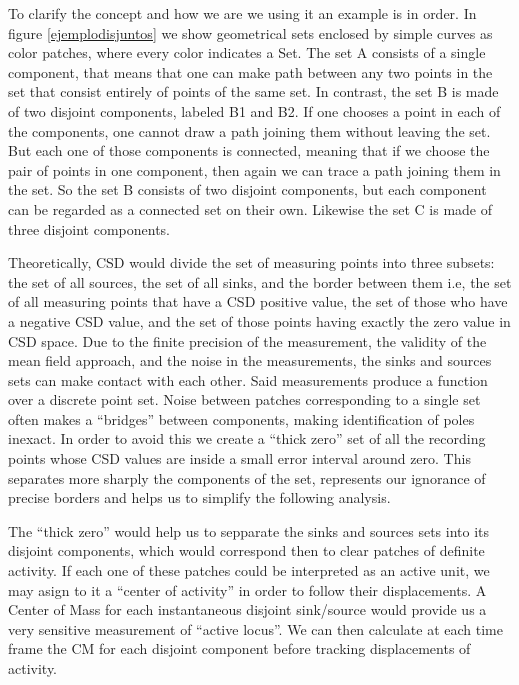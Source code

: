\documentclass{article}
\begin{document}
To clarify the concept and how we are we using it an example is in order. In figure \ref{ejemplodisjuntos} we show geometrical sets enclosed by simple curves as color patches, where every color indicates a Set. The set A consists of a single component, that means that one can make  path between any two points in the set that consist entirely of points of the same set. In contrast, the set B is made of two disjoint components, labeled B1 and B2. If one chooses a point in each of the components, one cannot draw a path joining them without leaving the set. But each one of those components is connected, meaning that if we choose the pair of points in one component, then again we can trace a path joining them in the set. So the set B consists of two disjoint components, but each component can be regarded as a connected set on their own. Likewise the set C is made of three disjoint components. 
 
Theoretically, CSD would divide the set of measuring points into three subsets: the set of all sources, the set of all sinks, and the border between them i.e, the set of all measuring points that have a CSD positive value, the set of those who have a negative CSD value, and the set of those points having exactly the zero value in CSD space.
Due to the finite precision of the measurement, the validity of the mean field approach, and the noise in the measurements, the sinks and sources sets can make contact with each other. Said measurements produce a function over a discrete point set. Noise between patches corresponding to a single set often makes a ``bridges'' between components, making identification of poles inexact. In order to avoid this we create a ``thick zero'' set of all the recording points whose CSD values are inside a small error interval around zero. This separates more sharply the components of the set, represents our ignorance of precise borders and helps us to simplify the following analysis.

The ``thick zero'' would help us to sepparate the sinks and sources sets into its disjoint components, which would correspond then to clear patches of definite activity. If each one of these patches could be interpreted as an active unit, we may asign to it a ``center of activity'' in order to follow their displacements. A Center of Mass for each instantaneous disjoint sink/source would provide us a very sensitive measurement of ``active locus''. We can then calculate at each time frame the CM for each disjoint component before tracking displacements of activity.
\end{document}
